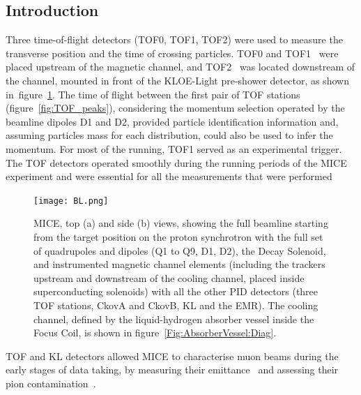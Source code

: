 \subsection{Introduction}
\label{SubSect:TOF_Intro}

Three time-of-flight detectors (TOF0, TOF1, TOF2) were used to measure the transverse position and the time
of crossing particles. TOF0 and TOF1~\cite{NOTE145}\cite{NOTE241}\cite{2010NIMPA.615...14B} were
placed upstream of the magnetic channel, and TOF2~\cite{NOTE286} was
located downstream of the channel, mounted in front of the KLOE-Light pre-shower detector, as shown
in~figure~\ref{fig:BL}.
The time of flight between the first pair of TOF stations (figure~\ref{fig:TOF_peaks}), considering the momentum selection operated by the beamline dipoles D1 and D2, provided particle identification information and, assuming particles mass for each distribution, could also be used to infer the momentum.
For most of the running, TOF1 served as an experimental trigger.
The TOF detectors operated smoothly during the running periods of the MICE experiment and were essential for all the measurements that were performed~\cite{Rajaram:2015bra}\cite{2015ehep.confE.521B}


\begin{figure}[!htb]
  \begin{center}
    \texttt{[image: BL.png]}
    \caption{MICE, top (a) and side (b) views, showing the full beamline starting from the target position on the proton synchrotron with the full set of quadrupoles and dipoles (Q1 to Q9, D1, D2), the Decay Solenoid, and instrumented magnetic channel elements (including the trackers upstream and downstream of the cooling channel, placed inside superconducting solenoids) with all the other PID detectors (three TOF stations, CkovA and CkovB, KL and the EMR). The cooling channel, defined by the liquid-hydrogen absorber vessel inside the Focus Coil, is shown in figure~\ref{Fig:AbsorberVessel:Diag}.}
    \label{fig:BL}
  \end{center}
\end{figure}

TOF and KL detectors allowed MICE to characterise muon beams during the early stages of data taking, by measuring their emittance~\cite{2013arXiv1306.1509T} and assessing their pion contamination~\cite{2016JInst..11P3001A}.

